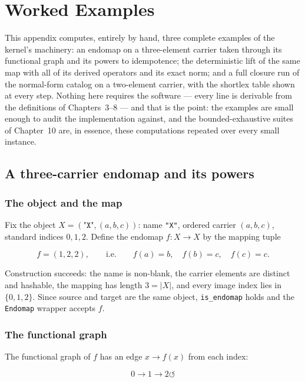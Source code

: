 \chapter{Worked Examples}\label{appA:examples}

This appendix computes, entirely by hand, three complete examples of the
kernel's machinery: an endomap on a three-element carrier taken through
its functional graph and its powers to idempotence; the deterministic
lift of the same map with all of its derived operators and its exact
norm; and a full closure run of the normal-form catalog on a two-element
carrier, with the shortlex table shown at every step. Nothing here
requires the software --- every line is derivable from the definitions
of Chapters~3--8 --- and that is the point: the examples are small
enough to audit the implementation against, and the bounded-exhaustive
suites of Chapter~10 are, in essence, these computations repeated over
every small instance.

\section{A three-carrier endomap and its powers}\label{appA:sec:endomap}

\subsection{The object and the map}

Fix the object $X = (\texttt{"X"}, (a, b, c))$: name \texttt{"X"},
ordered carrier $(a, b, c)$, standard indices $0, 1, 2$. Define the
endomap $f : X \to X$ by the mapping tuple

\[
f = (1, 2, 2), \qquad\text{i.e.}\qquad
f(a) = b,\quad f(b) = c,\quad f(c) = c .
\]

Construction succeeds: the name is non-blank, the carrier elements are
distinct and hashable, the mapping has length $3 = |X|$, and every image
index lies in $\{0, 1, 2\}$. Since source and target are the same
object, \texttt{is\_endomap} holds and the \texttt{Endomap} wrapper
accepts $f$.

\subsection{The functional graph}

The functional graph of $f$ has an edge $x \to f(x)$ from each index:

\[
0 \longrightarrow 1 \longrightarrow 2 \circlearrowleft
\]

